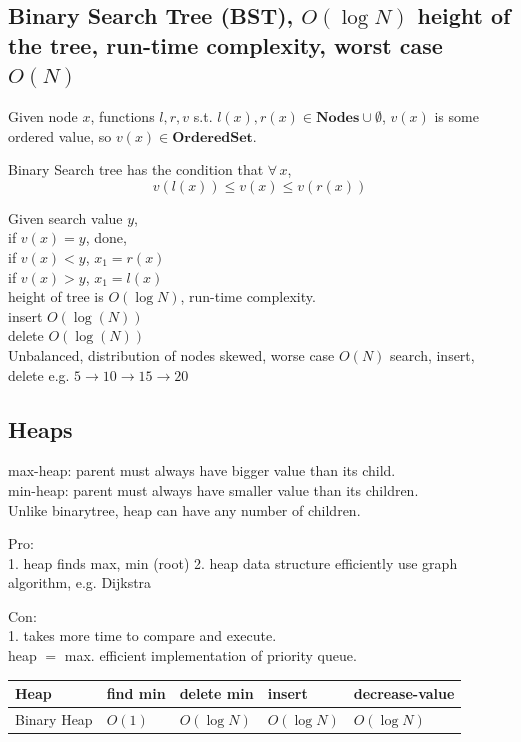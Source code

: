 \documentclass[10pt]{amsart}
\begin{document}
\subsection{Binary Search Tree (BST), $O(\log{N})$ height of the tree, run-time complexity, worst case $O(N)$}

Given node $x$, functions $l, r, v$ s.t. $l(x), r(x) \in \textbf{Nodes} \cup \emptyset$, $v(x)$ is some ordered value, so $v(x) \in \textbf{OrderedSet}$. 

Binary Search tree has the condition that $\forall \, x$, 
\[
v(l(x)) \leq v(x) \leq v(r(x))
\]

Given search value $y$, \\
if $v(x) = y$, done, \\
if $v(x) < y$, $x_1 = r(x)$ \\
if $v(x) > y$, $x_1= l(x)$ \\

height of tree is $O(\log{N})$, run-time complexity. \\
insert $O(\log{(N)})$ \\
delete $O(\log{(N)})$ \\

Unbalanced, distribution of nodes skewed, worse case $O(N)$ search, insert, delete e.g. $5 \to 10 \to 15 \to 20$

\subsection{Heaps}

max-heap: parent must always have bigger value than its child. \\
min-heap: parent must always have smaller value than its children. \\
Unlike binarytree, heap can have any number of children. 

Pro: \\ 
1. heap finds max, min (root)
2. heap data structure efficiently use graph algorithm, e.g. Dijkstra

Con: \\
1. takes more time to compare and execute. \\
heap $ = $ max. efficient implementation of priority queue. 

\begin{center}
	\begin{tabular}{ l | l | l | l | l  }
		\hline
		Heap & find min & delete min & insert & decrease-value \\ \hline
		Binary Heap & $O(1)$ & $O(\log{N})$ & $O(\log{N})$ & $O(\log{N})$ \\ \hline 
		\hline
	\end{tabular}
\end{center}
\end{document}

